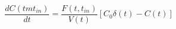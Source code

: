 \begin{equation}
\frac{dC(tmt_{in})}{dt} = \frac{F(t,t_{in})}{V(t)}[C_0\delta (t)-C(t)]
\end{equation}